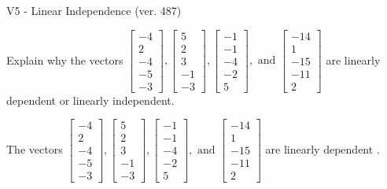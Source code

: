 \begin{exercise}
  \begin{exerciseTitle}V5 - Linear Independence (ver. 487)\end{exerciseTitle}
  \begin{exerciseStatement}
    Explain why the vectors \(\left[\begin{array}{r}
-4 \\
2 \\
-4 \\
-5 \\
-3
\end{array}\right] , \left[\begin{array}{r}
5 \\
2 \\
3 \\
-1 \\
-3
\end{array}\right] , \left[\begin{array}{r}
-1 \\
-1 \\
-4 \\
-2 \\
5
\end{array}\right] , \text{ and } \left[\begin{array}{r}
-14 \\
1 \\
-15 \\
-11 \\
2
\end{array}\right]\) are linearly dependent or linearly independent.	


  \end{exerciseStatement}
  \begin{exerciseAnswer}
   The vectors \(\left[\begin{array}{r}
-4 \\
2 \\
-4 \\
-5 \\
-3
\end{array}\right] , \left[\begin{array}{r}
5 \\
2 \\
3 \\
-1 \\
-3
\end{array}\right] , \left[\begin{array}{r}
-1 \\
-1 \\
-4 \\
-2 \\
5
\end{array}\right] , \text{ and } \left[\begin{array}{r}
-14 \\
1 \\
-15 \\
-11 \\
2
\end{array}\right]\) are 
  	 linearly dependent  .
  


  \end{exerciseAnswer}
\end{exercise}